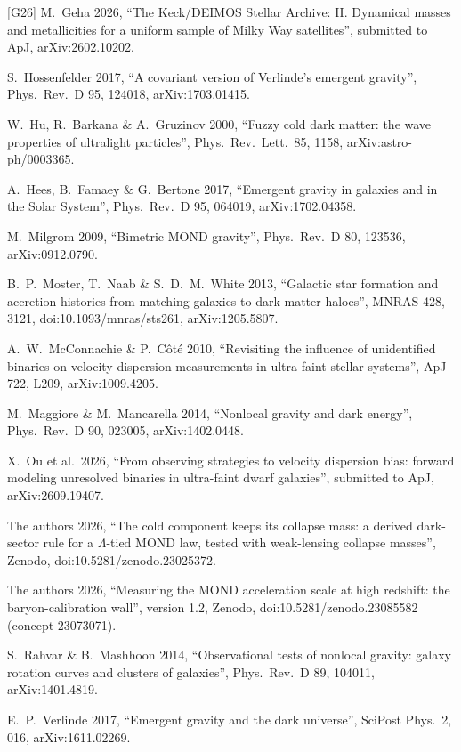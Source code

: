 \documentclass[10pt]{article}
\begin{document}
[G26] M.~Geha 2026, ``The Keck/DEIMOS Stellar Archive: II. Dynamical masses and metallicities for a uniform sample of Milky Way satellites'', submitted to ApJ, arXiv:2602.10202.\par
[H17] S.~Hossenfelder 2017, ``A covariant version of Verlinde's emergent gravity'', Phys.\ Rev.\ D 95, 124018, arXiv:1703.01415.\par
[HBG00] W.~Hu, R.~Barkana \& A.~Gruzinov 2000, ``Fuzzy cold dark matter: the wave properties of ultralight particles'', Phys.\ Rev.\ Lett.\ 85, 1158, arXiv:astro-ph/0003365.\par
[HFB17] A.~Hees, B.~Famaey \& G.~Bertone 2017, ``Emergent gravity in galaxies and in the Solar System'', Phys.\ Rev.\ D 95, 064019, arXiv:1702.04358.\par
[M09] M.~Milgrom 2009, ``Bimetric MOND gravity'', Phys.\ Rev.\ D 80, 123536, arXiv:0912.0790.\par
[M13] B.~P.~Moster, T.~Naab \& S.~D.~M.~White 2013, ``Galactic star formation and accretion histories from matching galaxies to dark matter haloes'', MNRAS 428, 3121, doi:10.1093/mnras/sts261, arXiv:1205.5807.\par
[MC10] A.~W.~McConnachie \& P.~C\^ot\'e 2010, ``Revisiting the influence of unidentified binaries on velocity dispersion measurements in ultra-faint stellar systems'', ApJ 722, L209, arXiv:1009.4205.\par
[MM14] M.~Maggiore \& M.~Mancarella 2014, ``Nonlocal gravity and dark energy'', Phys.\ Rev.\ D 90, 023005, arXiv:1402.0448.\par
[O26] X.~Ou et al.\ 2026, ``From observing strategies to velocity dispersion bias: forward modeling unresolved binaries in ultra-faint dwarf galaxies'', submitted to ApJ, arXiv:2609.19407.\par
[P36] The authors 2026, ``The cold component keeps its collapse mass: a derived dark-sector rule for a $\Lambda$-tied MOND law, tested with weak-lensing collapse masses'', Zenodo, doi:10.5281/zenodo.23025372.\par
[P38] The authors 2026, ``Measuring the MOND acceleration scale at high redshift: the baryon-calibration wall'', version 1.2, Zenodo, doi:10.5281/zenodo.23085582 (concept 23073071).\par
[RM14] S.~Rahvar \& B.~Mashhoon 2014, ``Observational tests of nonlocal gravity: galaxy rotation curves and clusters of galaxies'', Phys.\ Rev.\ D 89, 104011, arXiv:1401.4819.\par
[V17] E.~P.~Verlinde 2017, ``Emergent gravity and the dark universe'', SciPost Phys.\ 2, 016, arXiv:1611.02269.\par
\end{document}
